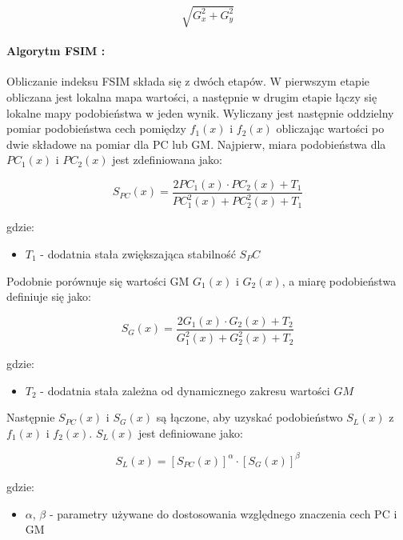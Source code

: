 \documentclass{article}
\begin{document}
\begin{equation}
\sqrt{G^2_x+G^2_y}
\end{equation}

\paragraph{Algorytm FSIM \cite{fsim_alg}:}
Obliczanie indeksu FSIM składa się z dwóch etapów. 
W pierwszym etapie obliczana jest lokalna mapa wartości, a następnie w drugim etapie łączy się lokalne mapy podobieństwa w jeden wynik.
Wyliczany jest następnie oddzielny pomiar podobieństwa cech pomiędzy $f_1(x)$ i $f_2(x)$ obliczając wartości po dwie 
składowe na pomiar dla PC lub GM. Najpierw, miara podobieństwa dla $PC_1 (x)$ i $PC_2(x)$ jest zdefiniowana jako:

\begin{equation}
S_{PC}(x) = \frac{2PC_1(x) \cdot PC_2(x) + T_1}{PC^2_1(x) + PC^2_2(x) + T_1}
\end{equation}

gdzie:
\begin{itemize}[label=]
    \item $T_1$ - dodatnia stała zwiększająca stabilność $S_PC$
\end{itemize}

Podobnie porównuje się wartości GM $G_1(x)$ i $G_2(x)$, a miarę podobieństwa definiuje się jako:

\begin{equation}
S_G(x) = \frac{2G_1(x) \cdot G_2(x) + T_2}{G^2_1(x) + G^2_2(x) + T_2}
\end{equation}

gdzie:
\begin{itemize}[label=]
    \item $T_2$ - dodatnia stała zależna od dynamicznego zakresu wartości $GM$
\end{itemize}

Następnie $S_{PC}(x)$ i $S_G(x)$ są łączone, aby uzyskać podobieństwo $S_L(x)$ z $f_1(x)$ i $f_2(x)$. $S_L(x)$ jest definiowane jako:

\begin{equation}
S_L(x) = [S_{PC}(x)]^\alpha \cdot [S_G(x)]^\beta
\end{equation}

gdzie:
\begin{itemize}[label=]
    \item $\alpha$, $\beta$ - parametry używane do dostosowania względnego znaczenia cech PC i GM
\end{itemize}
\end{document}
